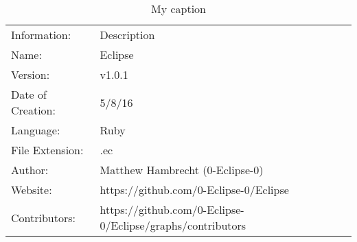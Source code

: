 \begin{table}[]
\centering
\caption{My caption}
\label{my-label}
\begin{tabular}{ll}
Information:      & Description                                                \\
Name:             & Eclipse                                                    \\
Version:          & v1.0.1                                                     \\
Date of Creation: & 5/8/16                                                     \\
Language:         & Ruby                                                       \\
File Extension:   & .ec                                                        \\
Author:           & Matthew Hambrecht (0-Eclipse-0)                            \\
Website:          & https://github.com/0-Eclipse-0/Eclipse                     \\
Contributors:     & https://github.com/0-Eclipse-0/Eclipse/graphs/contributors
\end{tabular}
\end{table}
